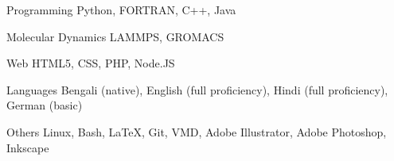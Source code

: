 


\begin{cvskills}


\cvskill
{Programming} %
{Python, FORTRAN, C++, Java} %


\cvskill
{Molecular Dynamics} %
{LAMMPS, GROMACS} %


\cvskill
{Web} %
{HTML5, CSS, PHP, Node.JS} %


\cvskill
{Languages} %
{Bengali (native), English (full proficiency), Hindi (full proficiency), German (basic)} %


\cvskill
{Others} %
{Linux, Bash, {\LaTeX}, Git, VMD, Adobe Illustrator, Adobe Photoshop, Inkscape} %



\end{cvskills}
